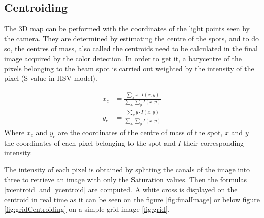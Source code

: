 \subsection{Centroiding}

The 3D map can be performed with the coordinates of the light points seen by the camera. They are determined by estimating the centre of the spots, and to do so, the centres of mass, also called the centroids need to be calculated in the final image acquired by the color detection. In order to get it, a barycentre of the pixels belonging to the beam spot is carried out weighted by the intensity of the pixel (S value in HSV model).

\begin{align}
x_c &= \frac{\sum_x x \cdot I(x,y)}{\sum_x \sum_y I(x,y)} \label{xcentroid} \\
y_c &= \frac{\sum_y y \cdot I(x,y)}{\sum_x \sum_y I(x,y)} \label{ycentroid}
\end{align}
Where $x_c$ and $y_c$ are the coordinates of the centre of mass of the spot, $x$ and $y$ the coordinates of each pixel belonging to the spot and $I$ their corresponding intensity.

The intensity of each pixel is obtained by splitting the canals of the image into three to retrieve an image with only the Saturation values. Then the formulas \eqref{xcentroid} and \eqref{ycentroid} are computed. A white cross is displayed on the centroid in real time as it can be seen on the figure \ref{fig:finalImage} or below figure \ref{fig:gridCentroiding} on a simple grid image \ref{fig:grid}.

